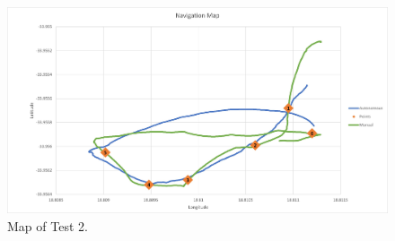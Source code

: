 \begin{landscape}
	\begin{figure}[hb]
		\begin{center}
			\includegraphics[width = \linewidth]{figures/graphMap2.jpg}
			\caption{Map of Test 2.}
			\label{graph:4:Map2}
		\end{center}
	\end{figure} 
\end{landscape}